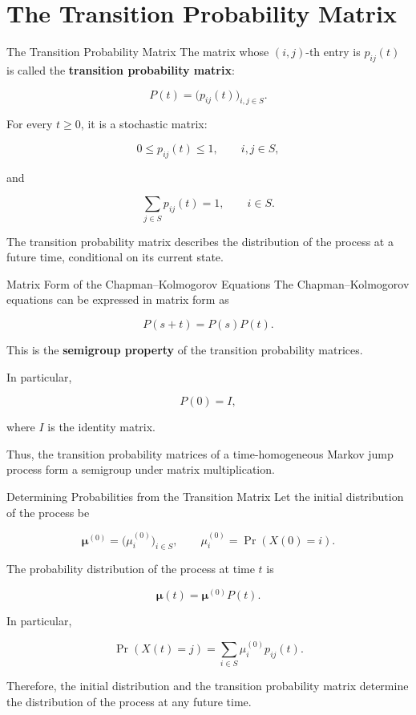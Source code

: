 \documentclass[
  ignorenonframetext,
  aspectratio=169,
]{beamer}
\begin{document}
\section{The Transition Probability
Matrix}\label{the-transition-probability-matrix}

\begin{frame}{The Transition Probability Matrix}
\protect{}\label{the-transition-probability-matrix-1}
The matrix whose \((i,j)\)-th entry is \(p_{ij}(t)\) is called the
\textbf{transition probability matrix}:

\[
P(t)=\bigl(p_{ij}(t)\bigr)_{i,j\in S}.
\]

For every \(t\geq 0\), it is a stochastic matrix:

\[
0\leq p_{ij}(t)\leq 1,
\qquad i,j\in S,
\]

and

\[
\boxed{
\sum_{j\in S}p_{ij}(t)=1,
\qquad i\in S.
}
\]

The transition probability matrix describes the distribution of the
process at a future time, conditional on its current state.
\end{frame}

\begin{frame}{Matrix Form of the Chapman--Kolmogorov Equations}
\protect{}\label{matrix-form-of-the-chapmankolmogorov-equations}
The Chapman--Kolmogorov equations can be expressed in matrix form as

\[
\boxed{
P(s+t)=P(s)P(t).
}
\]

This is the \textbf{semigroup property} of the transition probability
matrices.

In particular,

\[
P(0)=I,
\]

where \(I\) is the identity matrix.

Thus, the transition probability matrices of a time-homogeneous Markov
jump process form a semigroup under matrix multiplication.
\end{frame}

\begin{frame}{Determining Probabilities from the Transition Matrix}
\protect{}\label{determining-probabilities-from-the-transition-matrix}
Let the initial distribution of the process be

\[
\boldsymbol{\mu}^{(0)}
=
\bigl(\mu_i^{(0)}\bigr)_{i\in S},
\qquad
\mu_i^{(0)}=\Pr(X(0)=i).
\]

The probability distribution of the process at time \(t\) is

\[
\boxed{
\boldsymbol{\mu}(t)
=
\boldsymbol{\mu}^{(0)}P(t).
}
\]

In particular,

\[
\Pr(X(t)=j)
=
\sum_{i\in S}\mu_i^{(0)}p_{ij}(t).
\]

Therefore, the initial distribution and the transition probability
matrix determine the distribution of the process at any future time.
\end{frame}
\end{document}
